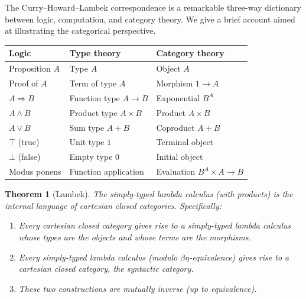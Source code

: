\documentclass[a4paper,12pt]{book}
\theoremstyle{definition}
\theoremstyle{plain}
\newtheorem{theorem}[definition]{Theorem}
\theoremstyle{remark}
\begin{document}

The Curry--Howard--Lambek correspondence is a remarkable three-way
dictionary between logic, computation, and category theory.  We give a
brief account aimed at illustrating the categorical perspective.

\begin{center}
\renewcommand{\arraystretch}{1.3}
\begin{tabular}{lll}
\hline
\textbf{Logic} & \textbf{Type theory} & \textbf{Category theory} \\
\hline
Proposition $A$ & Type $A$ & Object $A$ \\
Proof of $A$ & Term of type $A$ & Morphism $1\to A$ \\
$A\Rightarrow B$ & Function type $A\to B$ & Exponential $B^A$ \\
$A\wedge B$ & Product type $A\times B$ & Product $A\times B$ \\
$A\vee B$ & Sum type $A + B$ & Coproduct $A + B$ \\
$\top$ (true) & Unit type $1$ & Terminal object \\
$\bot$ (false) & Empty type $0$ & Initial object \\
Modus ponens & Function application & Evaluation $B^A\times A\to B$ \\
\hline
\end{tabular}
\end{center}

\begin{theorem}[Lambek]\label{thm:lambek}
The simply-typed lambda calculus (with products) is the internal language
of cartesian closed categories.  Specifically:
\begin{enumerate}[label=(\alph*)]
\item Every cartesian closed category gives rise to a simply-typed
      lambda calculus whose types are the objects and whose terms are
      the morphisms.
\item Every simply-typed lambda calculus (modulo $\beta\eta$-equivalence)
      gives rise to a cartesian closed category, the \emph{syntactic category}.
\item These two constructions are mutually inverse (up to equivalence).
\end{enumerate}
\end{theorem}
\end{document}
